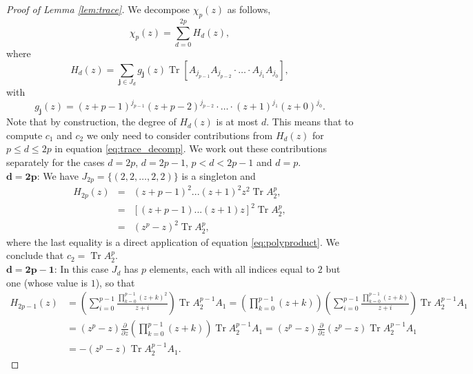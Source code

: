 \documentclass[10pt,a4paper]{amsart}
\begin{document}
\begin{proof}[Proof of Lemma \ref{lem:trace}]
We  decompose $\chi_p(z)$ as follows,
    \begin{equation}\label{eq:trace_decomp}
       \chi_p(z)=\sum_{d=0}^{2p} H_d(z),
    \end{equation}
where
\begin{equation}\label{eq:H(z) sum}
   H_d(z)=\sum_{\mathbf{j}\in J_d}g_\mathbf{j}(z) \operatorname{Tr}\left[A_{j_{p-1}}A_{j_{p-2}}\cdot\ldots\cdot A_{j_1}A_{j_0}\right],
\end{equation}
with
\begin{equation*}
    g_\mathbf{j}(z)=(z+p-1)^{j_{p-1}}(z+p-2)^{j_{p-2}}\cdot\ldots\cdot (z+1)^{j_1}(z+0)^{j_0}.
\end{equation*}
Note that by construction, the degree of $H_d(z)$ is at most $d$. This means that to compute $c_1$ and $c_2$ we only need to consider contributions from $H_d(z)$ for $p\leq d \leq 2p$ in equation \eqref{eq:trace_decomp}. We work out these contributions separately for the cases $d=2p$, $d=2p-1$, $p<d<2p-1$ and $d=p$.\\
$\mathbf{d=2p}$: We have $J_{2p}=\{(2,2,\ldots,2,2)\}$ is a singleton and
    \begin{eqnarray}
        H_{2p}(z) &=& (z+p-1)^2...(z+1)^2z^2\operatorname{Tr}A_{2}^p,\nonumber\\
        &=& [(z+p-1)...(z+1)z]^2\operatorname{Tr}A_{2}^p,\nonumber\\
        &=& (z^p-z)^2\operatorname{Tr}A_{2}^p,\label{eq:c3}
    \end{eqnarray} 
    where the last equality is a direct application of equation \eqref{eq:polyproduct}. We conclude that $c_2 = \operatorname{Tr}A_{2}^p$.\\
$\mathbf{d=2p-1}$: In this case $J_{d}$ has $p$ elements, each with all indices equal to $2$ but one (whose value is $1$), so that
    \begin{align}
        H_{2p-1}(z) &= \left( \sum_{i=0}^{p-1}\frac{\prod_{k=0}^{p-1} (z+k)^2}{z+i} \right) \operatorname{Tr}A_{2}^{p-1}A_1
        = \left(\prod_{k=0}^{p-1} (z+k)\right) \left( \sum_{i=0}^{p-1}\frac{\prod_{k=0}^{p-1} (z+k)}{z+i} \right) \operatorname{Tr}A_{2}^{p-1}A_1\nonumber\\
        &= (z^p-z)  \frac{\partial}{\partial z} \left( \prod_{k=0}^{p-1} (z+k)\right) \operatorname{Tr}A_{2}^{p-1}A_1=  (z^p-z)  \frac{\partial}{\partial z}(z^p-z) \operatorname{Tr}A_{2}^{p-1}A_1\nonumber\\
        &=  -(z^p-z)\operatorname{Tr}A_{2}^{p-1}A_1. \label{eq:c2(i)}
    \end{align} 

\end{proof}
\end{document}
